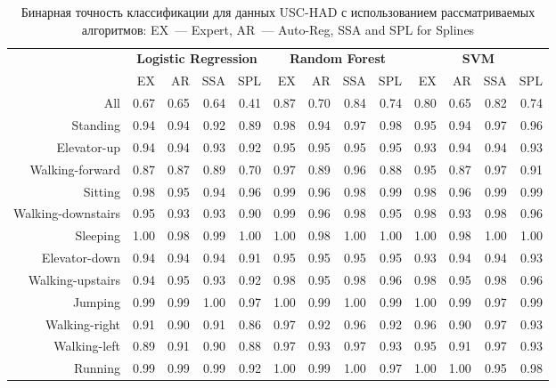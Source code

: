 \begin{table}[!ht]
	\centering
	\footnotesize
	\caption{Бинарная точность классификации для данных USC-HAD с использованием рассматриваемых алгоритмов: EX~--- Expert, AR~--- Auto-Reg, SSA and  SPL for Splines}
	\label{my-label}
	\begin{tabular}{r|rrrr|rrrr|rrrr|}
		& \multicolumn{4}{c|}{\textbf{Logistic Regression}} & \multicolumn{4}{c|}{\textbf{Random Forest}} & \multicolumn{4}{c|}{\textbf{SVM}}          \\ \cline{2-13} 
		& EX   & AR   & SSA   & SPL  & EX  & AR & SSA & SPL & EX & AR & SSA & SPL \\ \hline
		All& 0.67 & 0.65 & 0.64 & 0.41 & 0.87 & 0.70 & 0.84 & 0.74 & 0.80 & 0.65 & 0.82 & 0.74 \\
		Standing& 0.94 & 0.94 & 0.92 & 0.89 & 0.98 & 0.94 & 0.97 & 0.98 & 0.95 & 0.94 & 0.97 & 0.96 \\
		Elevator-up& 0.94 & 0.94 & 0.93 & 0.92 & 0.95 & 0.95 & 0.95 & 0.95 & 0.93 & 0.94 & 0.94 & 0.93 \\
		Walking-forward& 0.87 & 0.87 & 0.89 & 0.70 & 0.97 & 0.89 & 0.96 & 0.88 & 0.95 & 0.87 & 0.97 & 0.91 \\
		Sitting& 0.98 & 0.95 & 0.94 & 0.96 & 0.99 & 0.96 & 0.98 & 0.99 & 0.98 & 0.96 & 0.99 & 0.99 \\
		Walking-downstairs& 0.95 & 0.93 & 0.93 & 0.90 & 0.99 & 0.96 & 0.98 & 0.95 & 0.98 & 0.93 & 0.98 & 0.96 \\
		Sleeping& 1.00 & 0.98 & 0.99 & 1.00 & 1.00 & 0.98 & 1.00 & 1.00 & 1.00 & 0.98 & 1.00 & 1.00 \\
		Elevator-down& 0.94 & 0.94 & 0.94 & 0.91 & 0.95 & 0.95 & 0.95 & 0.95 & 0.93 & 0.94 & 0.94 & 0.93 \\
		Walking-upstairs& 0.94 & 0.95 & 0.93 & 0.92 & 0.98 & 0.95 & 0.98 & 0.96 & 0.98 & 0.95 & 0.98 & 0.96 \\
		Jumping& 0.99 & 0.99 & 1.00 & 0.97 & 1.00 & 0.99 & 1.00 & 0.99 & 1.00 & 0.99 & 0.97 & 0.99 \\
		Walking-right& 0.91 & 0.90 & 0.91 & 0.86 & 0.97 & 0.92 & 0.96 & 0.92 & 0.96 & 0.90 & 0.97 & 0.93 \\
		Walking-left& 0.89 & 0.91 & 0.90 & 0.88 & 0.97 & 0.93 & 0.97 & 0.93 & 0.95 & 0.91 & 0.97 & 0.93 \\
		Running& 0.99 & 0.99 & 0.99 & 0.92 & 1.00 & 0.99 & 1.00 & 0.97 & 1.00 & 1.00 & 0.95 & 0.98\\ \hline
	\end{tabular}
	\label{ch5:tbl:uschad_methods_results}
\end{table}


